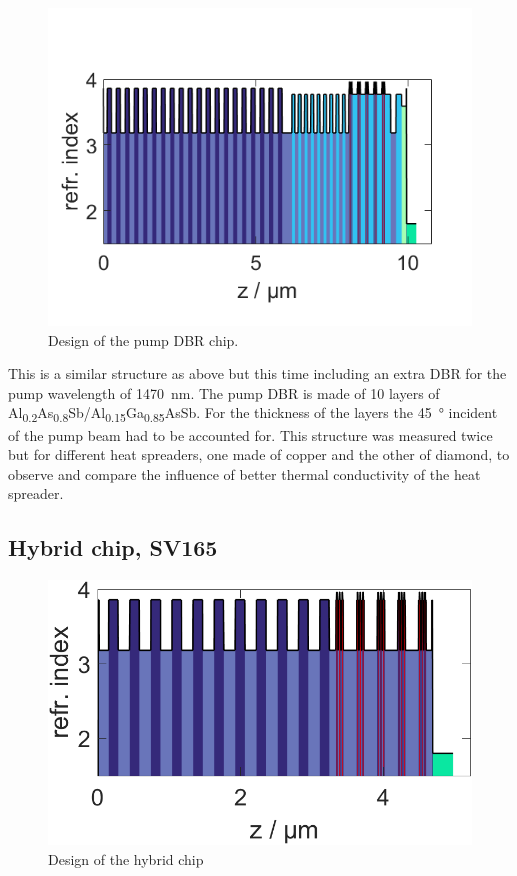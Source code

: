 \begin{figure}
    \vspace{-\baselineskip}
    \centering
    \includegraphics[width=.98\textwidth]{images/1SV167.lay.png}
    \caption{Design of the pump DBR chip.}
    \label{fig:sv167}
\end{figure}

This is a similar structure as above but this time including an extra DBR for the pump wavelength of \qty{1470}{\nm}. The pump DBR is made of 10 layers of Al\textsubscript{0.2}As\textsubscript{0.8}Sb/Al\textsubscript{0.15}Ga\textsubscript{0.85}AsSb. For the thickness of the layers the \qty{45}{\degree} incident of the pump beam had to be accounted for. This structure was measured twice but for different heat spreaders, one made of copper and the other of diamond, to observe and compare the influence of better thermal conductivity of the heat spreader.


\subsection*{Hybrid chip, SV165}

\begin{figure}
    \vspace{-\baselineskip}
    \centering
    \includegraphics[width=.98\textwidth]{images/1SV165.lay.png}
    \caption{Design of the hybrid chip}
    \label{fig:sv165}
\end{figure}

